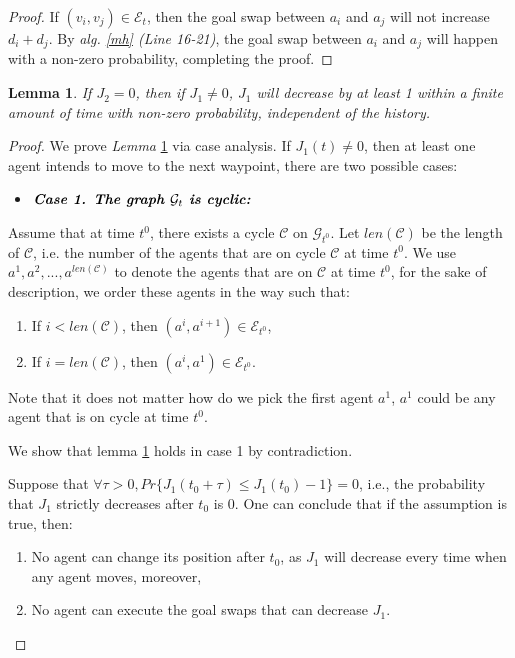 \documentclass[journal]{IEEEtran}
\newtheorem{lemma}{Lemma}[subsection]
\begin{document}
\begin{proof}

If $(v_i, v_j)\in \mathcal{E}_t$, then the goal swap between $a_i$ and $a_j$ will not increase $d_i + d_j$. By \textit{alg. \ref{mh} (\textit{Line 16-21})}, the goal swap between $a_i$ and $a_j$ will happen with a non-zero probability, completing the proof.
\end{proof}


\begin{lemma} 
If $J_2 = 0$, then if $J_1 \neq 0$, $J_1$ will decrease by at least 1 within a finite amount of time with non-zero probability, independent of the history.
\label{lemma3}
\end{lemma}
\begin{proof} 
We prove \textit{Lemma} \ref{lemma3} via case analysis. If $J_1(t) \neq 0$, then at least one agent intends to move to the next waypoint, there are two possible cases:

\begin{itemize}
\item $\textit{\textbf{Case 1. The graph $\mathcal{G}_t$ is cyclic:}}$
\end{itemize}


Assume that at time $t^0$, there exists a cycle $\mathcal{C}$ on $\mathcal{G}_{t^0}$. Let $len(\mathcal{C})$ be the length of $\mathcal{C}$, i.e. the number of the agents that are on cycle $\mathcal{C}$ at time ${t^0}$. We use $a^1, a^2, ..., a^{len(\mathcal{C})}$ to denote the agents that are on $\mathcal{C}$ at time $t^0$, for the sake of description, we order these agents in the way such that: 

\begin{enumerate}[label=\textbullet]
   \item If $i<len(\mathcal{C})$, then $(a^i, a^{i+1}) \in \mathcal{E}_{t^0}$, 
   \item If $i=len(\mathcal{C})$, then $(a^i, a^{1}) \in \mathcal{E}_{t^0}$. 
\end{enumerate}

\noindent Note that it does not matter how do we pick the first agent $a^1$, $a^1$ could be any agent that is on cycle at time $t^0$.

We show that lemma \ref{lemma3} holds in case 1 by contradiction.

Suppose that $\forall \tau > 0, Pr\{J_1(t_0 + \tau) \leq J_1(t_0) - 1\} = 0$, i.e., the probability that $J_1$ strictly decreases after $t_0$ is 0. One can conclude that if the assumption is true, then:
\begin{enumerate}[label=\textbullet]
   \item No agent can change its position after $t_0$, as $J_1$ will decrease every time when any agent moves, moreover, 
   \item No agent can execute the goal swaps that can decrease $J_1$. 
\end{enumerate}


\end{proof}
\end{document}
